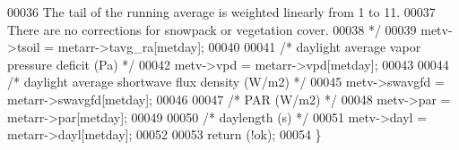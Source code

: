 \begin{DoxyCode}
00036 \textcolor{comment}{    The tail of the running average is weighted linearly from 1 to 11.}
00037 \textcolor{comment}{    There are no corrections for snowpack or vegetation cover. }
00038 \textcolor{comment}{    */}
00039     metv->tsoil = metarr->tavg\_ra[metday];
00040 
00041     \textcolor{comment}{/* daylight average vapor pressure deficit (Pa) */}
00042     metv->vpd = metarr->vpd[metday];
00043 
00044     \textcolor{comment}{/* daylight average shortwave flux density (W/m2) */}
00045     metv->swavgfd =  metarr->swavgfd[metday];
00046     
00047     \textcolor{comment}{/* PAR (W/m2) */}
00048     metv->par = metarr->par[metday];
00049 
00050     \textcolor{comment}{/* daylength (s) */}
00051     metv->dayl = metarr->dayl[metday];
00052 
00053     \textcolor{keywordflow}{return} (!ok);
00054 \}
\end{DoxyCode}
